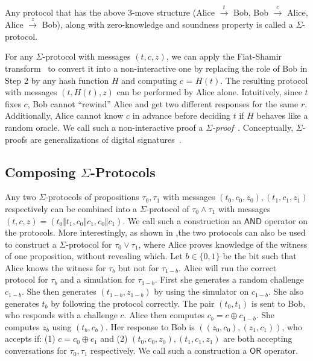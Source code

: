 \documentclass[runningheads]{llncs}
\newcommand{\andnode}{\ensuremath{\mathsf{AND}}}
\newcommand{\ornode}{\ensuremath{\mathsf{OR}}}
\begin{document}
Any protocol that has the above 3-move structure (Alice $\stackrel{t}{\rightarrow}$ Bob, Bob $\stackrel{c}{\rightarrow}$ Alice, Alice $\stackrel{z}{\rightarrow}$ Bob), along with zero-knowledge and soundness property is called a $\Sigma$-protocol. 

For any $\Sigma$-protocol with messages $(t, c, z)$, we can apply the Fiat-Shamir transform~\cite{fiatshamir} to convert it into a non-interactive one by replacing the role of Bob in Step 2 by any hash function $H$ and computing $c$ = $H(t)$. The resulting protocol with messages $(t, H(t), z)$ can be performed by Alice alone. Intuitively, since $t$ fixes $c$, Bob cannot ``rewind'' Alice and get two different responses for the same $r$. Additionally, Alice cannot know $c$ in advance before deciding $t$ if $H$ behaves like a random oracle. We call such a non-interactive proof a {\em $\Sigma$-proof}~\cite{Cra96}. Conceptually, $\Sigma$-proofs are generalizations of digital signatures~\cite{CL06}.

\subsection{Composing $\Sigma$-Protocols}
\label{sigma-or}
Any two $\Sigma$-protocols of propositions $\tau_0, \tau_1$ with messages $(t_0, c_0, z_0), (t_1, c_1, z_1)$ respectively can be combined into a $\Sigma$-protocol of $\tau_0 \land \tau_1$ with messages $(t, c, z) = (t_0\Vert t_1,c_0\Vert c_1, c_0\Vert c_1)$. We call such a construction an $\andnode$ operator on the protocols. 
More interestingly, as shown in \cite{CDS94},the two protocols can also be used to construct a $\Sigma$-protocol for $\tau_0\lor \tau_1$, where Alice proves knowledge of the witness of one proposition, without revealing which. Let $b\in \{0, 1\}$ be the bit such that Alice knows the witness for $\tau_b$ but not for $\tau_{1-b}$. Alice will run the correct protocol for $\tau_b$ and a simulation for $\tau_{1-b}$. First she generates a random challenge $c_{1-b}$. She then generates $(t_{1-b}, z_{1-b})$ by using the simulator on $c_{1-b}$. She also generates $t_b$ by following the protocol correctly. The pair $(t_0, t_1)$ is sent to Bob, who responds with a challenge $c$. Alice then computes $c_b = c\oplus c_{1-b}$. She computes $z_b$ using $(t_b, c_b)$. Her response to Bob is $((z_0, c_0), (z_1, c_1))$, who accepts if: (1) $c = c_0 \oplus c_1$ and (2) $(t_0, c_0, z_0), (t_1, c_1, z_1)$ are both accepting conversations for $\tau_0, \tau_1$ respectively. We call such a construction a $\ornode$ operator. 
\end{document}
